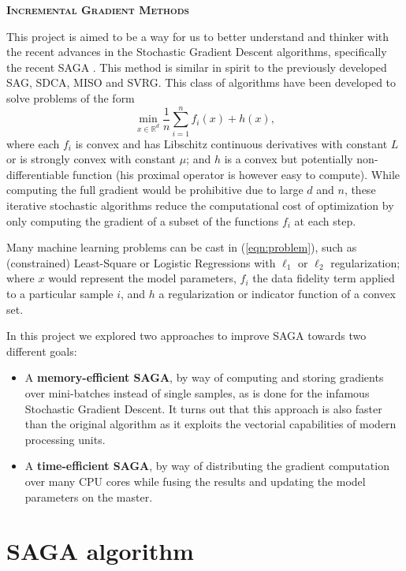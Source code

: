 \documentclass[a4paper,10pt]{article}
\newcommand{\R}{\mathbb{R}}
\newcommand{\eqnref}[1]{(\ref{eqn:#1})}
\begin{document}
\begin{center}
	\Large{\textbf{\textsc{Incremental Gradient Methods}}}
\end{center}

This project is aimed to be a way for us to better understand and thinker with
the recent advances in the Stochastic Gradient Descent algorithms, specifically
the recent SAGA \cite{defazio_saga_2014}. This method is similar in spirit to
the previously developed SAG, SDCA, MISO and SVRG. This class of algorithms have
been developed to solve problems of the form
\begin{equation} \label{eqn:problem}
	\min_{x \in \R^d} \frac{1}{n} \sum_{i=1}^n f_i(x) + h(x),
\end{equation}
where each $f_i$ is convex and has Libschitz continuous derivatives with
constant $L$ or is strongly convex with constant $\mu$; and $h$ is a convex but
potentially non-differentiable function (his proximal operator is however easy
to compute). While computing the full gradient would be prohibitive due to large
$d$ and $n$, these iterative stochastic algorithms reduce the computational cost
of optimization by only computing the gradient of a subset of the functions
$f_i$ at each step.

Many machine learning problems can be cast in \eqnref{problem}, such as
(constrained) Least-Square or Logistic Regressions with $\ell_1$ or $\ell_2$
regularization; where $x$ would represent the model parameters, $f_i$ the data
fidelity term applied to a particular sample $i$, and $h$ a regularization or
indicator function of a convex set.

In this project we explored two approaches to improve SAGA towards two different
goals:
\begin{itemize}
	\item A \textbf{memory-efficient SAGA}, by way of computing and storing
		gradients over mini-batches instead of single samples, as is done for
		the infamous Stochastic Gradient Descent. It turns out that this
		approach is also faster than the original algorithm as it exploits the
		vectorial capabilities of modern processing units.
	\item A \textbf{time-efficient SAGA}, by way of distributing the gradient
		computation over many CPU cores while fusing the results and updating
		the model parameters on the master.
\end{itemize}

\section{SAGA algorithm} \label{sec1}
\end{document}
